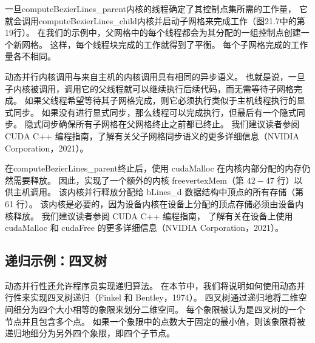 一旦computeBezierLines\_parent内核的线程确定了其控制点集所需的工作量，
它就会调用computeBezierLines\_child内核并启动子网格来完成工作（图21.7中的第19行）。 
在我们的示例中，父网格中的每个线程都会为其分配的一组控制点创建一个新网格。 这样，每个线程块完成的工作就得到了平衡。 
每个子网格完成的工作量各不相同。

动态并行内核调用与来自主机的内核调用具有相同的异步语义。 
也就是说，一旦子内核被调用，调用它的父线程就可以继续执行后续代码，而无需等待子网格完成。 
如果父线程希望等待其子网格完成，则它必须执行类似于主机线程执行的显式同步。 
如果没有进行显式同步，那么线程可以完成执行，但最后有一个隐式同步。 隐式同步确保所有子网格在父网格终止之前都已终止。 
我们建议读者参阅 CUDA C++ 编程指南，了解有关父子网格同步语义的更多详细信息（NVIDIA Corporation，2021）。

在computeBezierLines\_parent终止后，使用 cudaMalloc 在内核内部分配的内存仍然需要释放。 
因此，实现了一个额外的内核 freevertexMem（第 $42-47$ 行）以供主机调用。 
该内核并行释放分配给 bLines\_d 数据结构中顶点的所有存储（第 61 行）。 
该内核是必要的，因为设备内核在设备上分配的顶点存储必须由设备内核释放。 
我们建议读者参阅 CUDA C++ 编程指南，
了解有关在设备上使用 cudaMalloc 和 cudaFree 的更多详细信息（NVIDIA Corporation，2021）。

\subsection{递归示例：四叉树}
动态并行性还允许程序员实现递归算法。 在本节中，我们将说明如何使用动态并行性来实现四叉树递归（Finkel 和 Bentley，1974）。 
四叉树通过递归地将二维空间细分为四个大小相等的象限来划分二维空间。 每个象限被认为是四叉树的一个节点并且包含多个点。 
如果一个象限中的点数大于固定的最小值，则该象限将被递归地细分为另外四个象限，即四个子节点。

